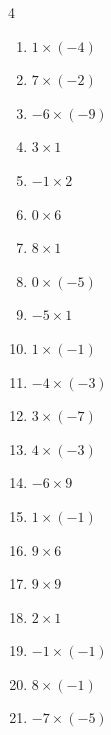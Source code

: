 \begin{multicols}{4}
\begin{enumerate}
  \item $1\times (-4)$
        \phantom{$=-4$}

  \item $7\times (-2)$
        \phantom{$=-14$}

  \item $-6\times (-9)$
        \phantom{$=54$}

  \item $3\times 1$
        \phantom{$=3$}

  \item $-1\times 2$
        \phantom{$=-2$}

  \item $0\times 6$
        \phantom{$=0$}

  \item $8\times 1$
        \phantom{$=8$}

  \item $0\times (-5)$
        \phantom{$=0$}

  \item $-5\times 1$
        \phantom{$=-5$}

  \item $1\times (-1)$
        \phantom{$=-1$}

  \item $-4\times (-3)$
        \phantom{$=12$}

  \item $3\times (-7)$
        \phantom{$=-21$}

  \item $4\times (-3)$
        \phantom{$=-12$}

  \item $-6\times 9$
        \phantom{$=-54$}

  \item $1\times (-1)$
        \phantom{$=-1$}

  \item $9\times 6$
        \phantom{$=54$}

  \item $9\times 9$
        \phantom{$=81$}

  \item $2\times 1$
        \phantom{$=2$}

  \item $-1\times (-1)$
        \phantom{$=1$}

  \item $8\times (-1)$
        \phantom{$=-8$}

  \item $-7\times (-5)$
        \phantom{$=35$}


\end{enumerate}
\end{multicols}

